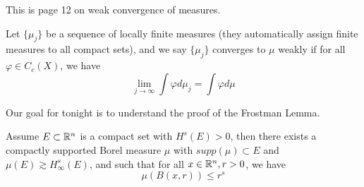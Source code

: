 This is page 12 on weak convergence of measures.
\begin{definition}
    Let $\{\mu_j\}$ be a sequence of locally finite measures (they automatically assign finite measures to all compact sets), and we say $\{\mu_j\}$ converges to $\mu$ weakly if for all $\varphi\in C_c(X)$, we have
    \begin{equation*}
        \lim_{j\to\infty}\int\varphi d\mu_j=\int \varphi d\mu
    \end{equation*}
\end{definition}

Our goal for tonight is to understand the proof of the Frostman Lemma.
\begin{lemma}
    Assume $E\subset\mathbb{R}^n$ is a compact set with $H^s(E)>0$, then there exists a compactly supported Borel measure $\mu$ with $supp(\mu)\subset E$ and $\mu(E)\gtrsim H_\infty^s(E)$, and such that for all $x\in\mathbb{R}^n, r>0$, we have
    \begin{equation*}
        \mu(B(x,r))\leq r^s
    \end{equation*}
\end{lemma}

